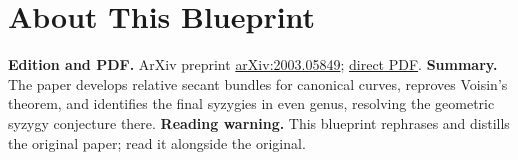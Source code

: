

\chapter*{About This Blueprint}
\label{universal-secant-bundles-syzygies-canonical-curves-about}

\textbf{Edition and PDF.} ArXiv preprint \href{https://arxiv.org/abs/2003.05849}{arXiv:2003.05849};
\href{https://arxiv.org/pdf/2003.05849}{direct PDF}.
\textbf{Summary.} The paper develops relative secant bundles for canonical curves, reproves Voisin's theorem,
and identifies the final syzygies in even genus, resolving the geometric syzygy conjecture there.
\textbf{Reading warning.} This blueprint rephrases and distills the original paper; read it alongside the original.









